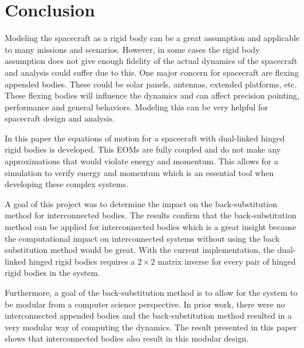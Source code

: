 \documentclass[paper]{aiaaNew}
\begin{document}
	\section{Conclusion}
	
	Modeling the spacecraft as a rigid body can be a great assumption and applicable to many missions and scenarios. However, in some cases the rigid body assumption does not give enough fidelity of the actual dynamics of the spacecraft and analysis could suffer due to this. One major concern for spacecraft are flexing appended bodies. These could be solar panels, antennas, extended platforms, etc. These flexing bodies will influence the dynamics and can affect precision pointing, performance and general behaviors. Modeling this can be very helpful for spacecraft design and analysis. 
	
	In this paper the equations of motion for a spacecraft with dual-linked hinged rigid bodies is developed. This EOMs are fully coupled and do not make any approximations that would violate energy and momentum. This allows for a simulation to verify energy and momentum which is an essential tool when developing these complex systems. 
	
	A goal of this project was to determine the impact on the back-substitution method for interconnected bodies. The results confirm that the back-substitution method can be applied for interconnected bodies which is a great insight because the computational impact on interconnected systems without using the back substitution method would be great. With the current implementation, the dual-linked hinged rigid bodies requires a $2\times 2$ matrix inverse for every pair of hinged rigid bodies in the system. 
	
	Furthermore, a goal of the back-substitution method is to allow for the system to be modular from a computer science perspective. In prior work, there were no interconnected appended bodies and the back-substitution method resulted in a very modular way of computing the dynamics. The result presented in this paper shows that interconnected bodies also result in this modular design. 
	
	
	
\end{document}
